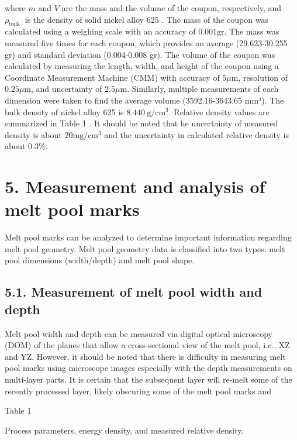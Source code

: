 \documentclass[10pt]{article}
\begin{document}
where $m$ and $V$ are the mass and the volume of the coupon, respectively, and $\rho_{\text {bulk }}$ is the density of solid nickel alloy 625 . The mass of the coupon was calculated using a weighing scale with an accuracy of $0.001 \mathrm{gr}$. The mass was measured five times for each coupon, which provides an average (29.623-30.255 gr) and standard deviation (0.004-0.008 gr). The volume of the coupon was calculated by measuring the length, width, and height of the coupon using a Coordinate Measurement Machine (CMM) with accuracy of $5 \mu \mathrm{m}$, resolution of $0.25 \mu \mathrm{m}$, and uncertainty of $2.5 \mu \mathrm{m}$. Similarly, multiple measurements of each dimension were taken to find the average volume (3592.16-3643.65 mm³). The bulk density of nickel alloy 625 is $8.440 \mathrm{~g} / \mathrm{cm}^{3}$. Relative density values are summarized in Table 1 . It should be noted that he uncertainty of measured density is about $20 \mathrm{mg} / \mathrm{cm}^{3}$ and the uncertainty in calculated relative density is about $0.3 \%$.

\section*{5. Measurement and analysis of melt pool marks}
Melt pool marks can be analyzed to determine important information regarding melt pool geometry. Melt pool geometry data is classified into two types: melt pool dimensions (width/depth) and melt pool shape.

\subsection*{5.1. Measurement of melt pool width and depth}
Melt pool width and depth can be measured via digital optical microscopy (DOM) of the planes that allow a cross-sectional view of the melt pool, i.e., XZ and YZ. However, it should be noted that there is difficulty in measuring melt pool marks using microscope images especially with the depth measurements on multi-layer parts. It is certain that the subsequent layer will re-melt some of the recently processed layer, likely obscuring some of the melt pool marks and

Table 1

Process parameters, energy density, and measured relative density.
\end{document}
